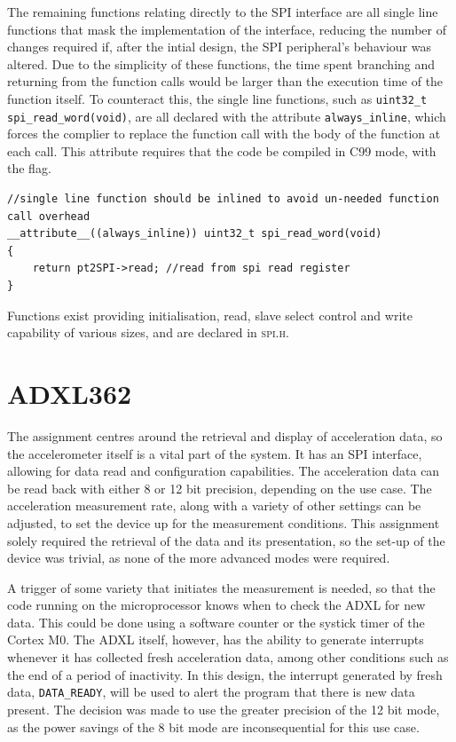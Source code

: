 \documentclass[11pt,british]{report}
\begin{document}
The remaining functions relating directly to the SPI interface are all single line functions that mask the implementation of the interface, reducing the number of changes required if, after the intial design, the SPI peripheral's behaviour was altered. Due to the simplicity of these functions, the time spent branching and returning from the function calls would be larger than the execution time of the function itself. To counteract this, the single line functions, such as \lstinline[style={c-style}]|uint32_t spi_read_word(void)|, are all declared with the attribute \texttt{always\_inline}, which forces the complier to replace the function call with the body of the function at each call. This attribute requires that the code be compiled in C99 mode, with the flag. %
\begin{lstlisting}[style={c-style}]
//single line function should be inlined to avoid un-needed function call overhead
__attribute__((always_inline)) uint32_t spi_read_word(void)
{
	return pt2SPI->read; //read from spi read register
}
\end{lstlisting}
Functions exist providing initialisation, read, slave select control and write capability of various sizes, and are declared in \textsc{spi.h}.

\section*{ADXL362}
The assignment centres around the retrieval and display of acceleration data, so the accelerometer itself is a vital part of the system. It has an SPI interface, allowing for data read and configuration capabilities. The acceleration data can be read back with either 8 or 12 bit precision, depending on the use case. The acceleration measurement rate, along with a variety of other settings can be adjusted, to set the device up for the measurement conditions. This assignment solely required the retrieval of the data and its presentation, so the set-up of the device was trivial, as none of the more advanced modes were required.

A trigger of some variety that initiates the measurement is needed, so that the code running on the microprocessor knows when to check the ADXL for new data. This could be done using a software counter or the systick timer of the Cortex M0. The ADXL itself, however, has the ability to generate interrupts whenever it has collected fresh acceleration data, among other conditions such as the end of a period of inactivity. In this design, the interrupt generated by fresh data, \texttt{DATA\_READY}, will be used to alert the program that there is new data present. The decision was made to use the greater precision of the 12 bit mode, as the power savings of the 8 bit mode are inconsequential for this use case.
\end{document}
